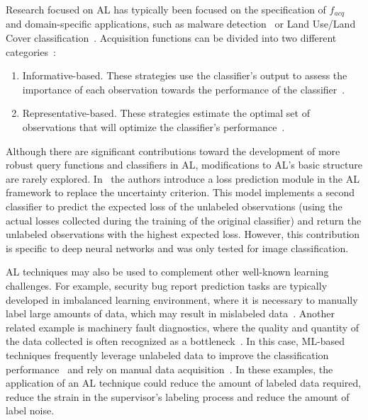 Research focused on AL has typically been focused on the specification of
$f_{acq}$~\cite{hospedales2011finding} and domain-specific applications, such
as malware detection~\cite{li2022boosting} or Land Use/Land Cover
classification~\cite{li2020}. Acquisition functions can be divided into
two different categories~\cite{su2021cost, Kumar2020}: 

\begin{enumerate}

    \item Informative-based. These strategies use the classifier's output to
        assess the importance of each observation towards the performance of
        the classifier~\cite{Fu2013}.

    \item Representative-based. These strategies estimate the optimal set of
        observations that will optimize the classifier's
        performance~\cite{Kumar2020}.

\end{enumerate}

Although there are significant contributions toward the development of more
robust query functions and classifiers in AL, modifications to AL's basic
structure are rarely explored. In~\cite{Yoo2019} the authors introduce a loss
prediction module in the AL framework to replace the uncertainty criterion.
This model implements a second classifier to predict the expected loss of the
unlabeled observations (using the actual losses collected during the training
of the original classifier) and return the unlabeled observations with the
highest expected loss. However, this contribution is specific to deep neural
networks and was only tested for image classification.



AL techniques may also be used to complement other well-known learning
challenges. For example, security bug report prediction tasks are typically
developed in imbalanced learning environment, where it is necessary to
manually label large amounts of data, which may result in mislabeled
data~\cite{wu2021data}. Another related example is machinery fault
diagnostics, where the quality and quantity of the data collected is often
recognized as a bottleneck~\cite{zhang2023blockchain}. In this case,
ML-based techniques frequently leverage unlabeled data to improve the
classification performance~\cite{zhang2021open} and rely on manual data
acquisition~\cite{he2017deep}. In these examples, the application of an
AL technique could reduce the amount of labeled data required, reduce the
strain in the supervisor's labeling process and reduce the amount of label
noise. 

